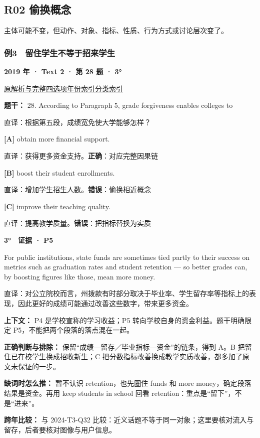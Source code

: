 \documentclass[11pt,a4paper]{article}
\begin{document}
\subsection{R02 偷换概念}
主体可能不变，但动作、对象、指标、性质、行为方式或讨论层次变了。

\subsubsection{例3　留住学生不等于招来学生}\label{case-2019-T2-Q28}
\noindent\textbf{2019 年 · Text 2 · 第 28 题 · 3°}\par\noindent \href{https://zj139.github.io/math-notes/english/107ec057655f55ef9ad0ea14/\#q28}{原解析与完整四选项}\quad \hyperref[idx-2019-T2-Q28]{年份索引}\quad \hyperref[class-R02]{分类索引}\par\smallskip
\noindent\textbf{题干：} 28. According to Paragraph 5, grade forgiveness enables colleges to\par\smallskip
直译：根据第五段，成绩宽免使大学能够怎样？

\noindent\textbf{[A]} obtain more financial support.\par\nopagebreak
\noindent 直译：获得更多资金支持。\quad\textbf{正确}：对应完整因果链\par\smallskip
{}\noindent\textbf{[B]} boost their student enrollments.\par\nopagebreak
\noindent 直译：增加学生招生人数。\quad\textbf{错误}：偷换相近概念\par\smallskip
{}\noindent\textbf{[C]} improve their teaching quality.\par\nopagebreak
\noindent 直译：提高教学质量。\quad\textbf{错误}：把指标替换为实质\par\smallskip
\begin{evidence}\textbf{3°　证据 · P5}\par For public institutions, state funds are sometimes tied partly to their success on metrics such as graduation rates and student retention — so better grades can, by boosting figures like those, mean more money.\par 直译：对公立院校而言，州拨款有时部分取决于毕业率、学生留存率等指标上的表现，因此更好的成绩可能通过改善这些数字，带来更多资金。\end{evidence}
\noindent\textbf{上下文：} P4 是学校宣称的学习收益；P5 转向学校自身的资金利益。题干明确限定 P5，不能把两个段落的落点混在一起。\par\smallskip
\noindent\textbf{正确判断与排除：} 保留“成绩—留存／毕业指标—资金”的链条，得到 A。B 把留住已在校学生换成招收新生；C 把分数指标改善换成教学实质改善，都多加了原文未保证的一步。\par\smallskip
\noindent\textbf{缺词时怎么推：} 暂不认识 retention，也先圈住 funds 和 more money，确定段落结果是资金。再用 keep students in school 回看 retention：重点是“留下”，不是“进来”。\par\smallskip
\noindent\textbf{跨年比较：} 与 2024-T3-Q32 比较：近义话题不等于同一对象；这里要核对流入与留存，后者要核对图像与用户信息。\par\smallskip
\clearpage
\end{document}
